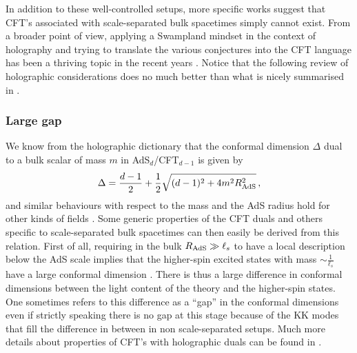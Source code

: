 \documentclass[11pt, a4paper]{article}
\newcommand{\Rads}{R_{\rm AdS}}
\newcommand{\half}{\frac{1}{2}}
\begin{document}
In addition to these well-controlled setups, more specific works suggest that CFT's associated with scale-separated bulk spacetimes simply cannot exist. From a broader point of view, applying a Swampland mindset in the context of holography and trying to translate the various conjectures into the CFT language has been a thriving topic in the recent years \cite{Harlow:2015lma,Giombi:2017mxl,Harlow:2018jwu,Harlow:2018tng,Montero:2018fns,Baume:2020dqd,Perlmutter:2020buo,Harlow:2020bee,Aharony:2021mpc,Baume:2023msm}. Notice that the following review of holographic considerations does no much better than what is nicely summarised in \cite[section 5.6]{VanRiet:2023pnx}.

\subsubsection{Large gap}

We know from the holographic dictionary \cite{Maldacena:1997re} that the conformal dimension $\Delta$ dual to a bulk scalar of mass $m$ in AdS$_d$/CFT$_{d-1}$ is given by \cite{Witten:1998qj,Gubser:1998bc,Aharony:1999ti}
\begin{equation}
\label{eq:Delta}
\Delta=\frac{d-1}{2}+\half\sqrt{(d-1)^2+4m^2\Rads^2}\, ,
\end{equation}
%
and similar behaviours with respect to the mass and the AdS radius hold for other kinds of fields \cite{Aharony:1999ti,Freedman:1999gp}. Some generic properties of the CFT duals and others specific to scale-separated bulk spacetimes can then easily be derived from this relation. First of all, requiring in the bulk $\Rads\gg \ell_s$ to have a local description below the AdS scale implies that the higher-spin excited states with mass $\sim \frac{1}{\ell_s}$ have a large conformal dimension \cite{Heemskerk:2009pn}. There is thus a large difference in conformal dimensions between the light content of the theory and the higher-spin states. One sometimes refers to this difference as a ``gap'' in the conformal dimensions even if strictly speaking there is no gap at this stage because of the KK modes that fill the difference in between in non scale-separated setups. Much more details about properties of CFT's with holographic duals can be found in \cite{El-Showk:2011yvt,Fitzpatrick:2012cg}.
\end{document}
